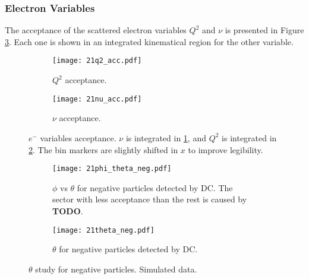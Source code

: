 \subsubsection{Electron Variables}
\label{14.21::electron_variables}
    The acceptance of the scattered electron variables $Q^2$ and $\nu$ is presented in Figure \ref{fig::14.21::electron_acc}.
    Each one is shown in an integrated kinematical region for the other variable.

    \begin{figure}[t!]
        \centering
        \begin{subfigure}[b]{\textwidth}
            \centering
            \texttt{[image: 21q2\_acc.pdf]}
            \caption{$Q^2$ acceptance.}
            \label{fig::14.21::q2_acc}
        \end{subfigure}
        \hfill
        \begin{subfigure}[b]{\textwidth}
            \centering
            \texttt{[image: 21nu\_acc.pdf]}
            \caption{$\nu$ acceptance.}
            \label{fig::14.21::nu_acc}
        \end{subfigure}
        \caption[$e^-$ variables acceptance]
        {$e^-$ variables acceptance.
        $\nu$ is integrated in \ref{fig::14.21::q2_acc}, and $Q^2$ is integrated in \ref{fig::14.21::nu_acc}.
        The bin markers are slightly shifted in $x$ to improve legibility.}
        \label{fig::14.21::electron_acc}
    \end{figure}

    \begin{figure}
        \centering
        \begin{subfigure}[b]{\textwidth}
            \centering
            \texttt{[image: 21phi\_theta\_neg.pdf]}
            \caption[$\phi$ vs $\theta$ for negative particles]
            {$\phi$ vs $\theta$ for negative particles detected by DC.
            The sector with less acceptance than the rest is caused by \textbf{TODO}.}
            \label{fig::14.21::phi_theta_neg}
        \end{subfigure}
        \begin{subfigure}[b]{\textwidth}
            \centering
            \texttt{[image: 21theta\_neg.pdf]}
            \caption[$\theta$ for negative particles]
            {$\theta$ for negative particles detected by DC.}
            \label{fig::14.21::theta_neg}
        \end{subfigure}
        \caption[$\theta$ study for negative particles]
        {$\theta$ study for negative particles.
        Simulated data.}
        \label{fig::14.21::theta_study_neg}
    \end{figure}

